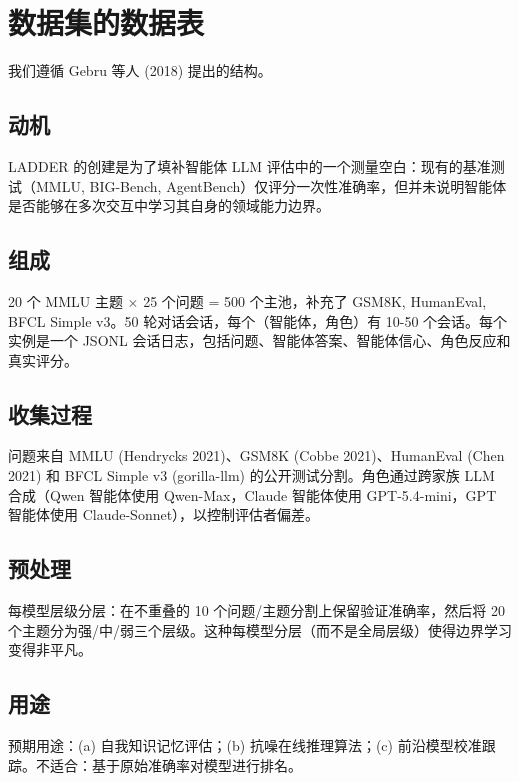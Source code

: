 \documentclass[11pt,a4paper,fontset=fandol]{ctexart}
\begin{document}
\appendix



\section*{数据集的数据表}

我们遵循 Gebru 等人 (2018) 提出的结构。

\subsection*{动机}
LADDER 的创建是为了填补智能体 LLM 评估中的一个测量空白：现有的基准测试（MMLU, BIG-Bench, AgentBench）仅评分一次性准确率，但并未说明智能体是否能够在多次交互中学习其自身的领域能力边界。

\subsection*{组成}
20 个 MMLU 主题 $\times$ 25 个问题 = 500 个主池，补充了 GSM8K, HumanEval, BFCL Simple v3。50 轮对话会话，每个（智能体，角色）有 10-50 个会话。每个实例是一个 JSONL 会话日志，包括问题、智能体答案、智能体信心、角色反应和真实评分。

\subsection*{收集过程}
问题来自 MMLU (Hendrycks 2021)、GSM8K (Cobbe 2021)、HumanEval (Chen 2021) 和 BFCL Simple v3 (gorilla-llm) 的公开测试分割。角色通过跨家族 LLM 合成（Qwen 智能体使用 Qwen-Max，Claude 智能体使用 GPT-5.4-mini，GPT 智能体使用 Claude-Sonnet），以控制评估者偏差。

\subsection*{预处理}
每模型层级分层：在不重叠的 10 个问题/主题分割上保留验证准确率，然后将 20 个主题分为强/中/弱三个层级。这种每模型分层（而不是全局层级）使得边界学习变得非平凡。

\subsection*{用途}
预期用途：(a) 自我知识记忆评估；(b) 抗噪在线推理算法；(c) 前沿模型校准跟踪。不适合：基于原始准确率对模型进行排名。
\end{document}
